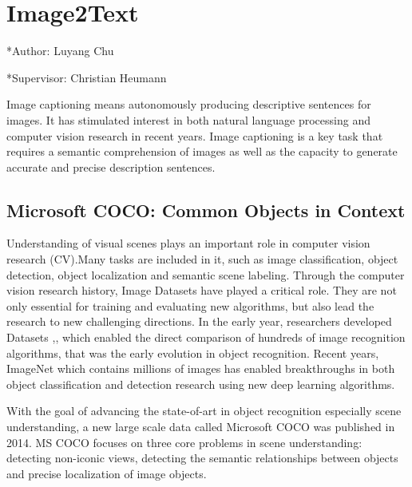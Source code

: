 \documentclass[
]{krantz}
\begin{document}
\hypertarget{c02-01-img2text}{%
\section{Image2Text}\label{c02-01-img2text}}

*Author: Luyang Chu

*Supervisor: Christian Heumann

Image captioning means autonomously producing descriptive sentences for images. It has stimulated interest in both natural language processing and computer vision research in recent years. Image captioning is a key task that requires a semantic comprehension of images as well as the capacity to generate accurate and precise description sentences.

\hypertarget{microsoft-coco-common-objects-in-context}{%
\subsection{Microsoft COCO: Common Objects in Context}\label{microsoft-coco-common-objects-in-context}}

Understanding of visual scenes plays an important role in computer vision research (CV).Many tasks are included in it, such as image classification, object detection, object localization and semantic scene labeling.
Through the computer vision research history, Image Datasets have played a critical role. They are not only essential for training and evaluating new algorithms, but also lead the research to new challenging directions.\citep{mccoco} In the early year, researchers developed Datasets \citep{deng2009imagenet},\citep{sun},\citep{pascalvoc} which enabled the direct comparison of hundreds of image recognition algorithms, that was the early evolution in object recognition. Recent years, ImageNet \citep{deng2009imagenet} which contains millions of images has enabled breakthroughs in both object classification and detection research using new deep learning algorithms.

With the goal of advancing the state-of-art in object recognition especially scene understanding, a new large scale data called Microsoft COCO was published in 2014. MS COCO focuses on three core problems in scene understanding: detecting non-iconic views, detecting the semantic relationships between objects and precise localization of image objects.\citep{mccoco}
\end{document}
